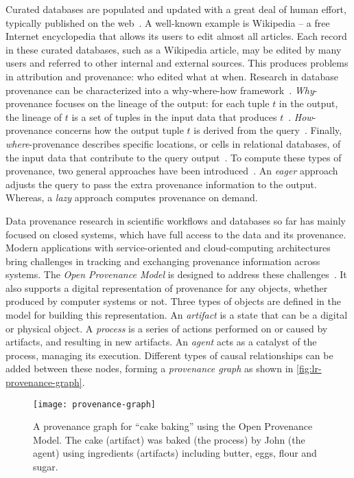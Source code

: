 Curated databases are populated and updated with a great deal of human effort, typically published on the web~\cite{Buneman2008}. A well-known example is Wikipedia -- a free Internet encyclopedia that allows its users to edit almost all articles. Each record in these curated databases, such as a Wikipedia article, may be edited by many users and referred to other internal and external sources. This produces problems in attribution and provenance: who edited what at when. Research in database provenance can be characterized into a why-where-how framework~\cite{Cheney2007}. \emph{Why}-provenance focuses on the lineage of the output: for each tuple $t$ in the output, the lineage of $t$ is a set of tuples in the input data that produces $t$~\cite{Cui2000}. \emph{How}-provenance concerns how the output tuple $t$ is derived from the query~\cite{Green2007}. Finally, \emph{where}-provenance describes specific locations, or cells in relational databases, of the input data that contribute to the query output~\cite{Buneman2001}. To compute these types of provenance, two general approaches have been introduced~\cite{Buneman2008}. An \emph{eager} approach adjusts the query to pass the extra provenance information to the output. Whereas, a \emph{lazy} approach computes provenance on demand.

Data provenance research in scientific workflows and databases so far has mainly focused on closed systems, which have full access to the data and its provenance. Modern applications with service-oriented and cloud-computing architectures bring challenges in tracking and exchanging provenance information across systems. The \emph{Open Provenance Model} is designed to address these challenges~\cite{Moreau2011}. It also supports a digital representation of provenance for any objects, whether produced by computer systems or not. Three types of objects are defined in the model for building this representation. An \emph{artifact} is a state that can be a digital or physical object. A \emph{process} is a series of actions performed on or caused by artifacts, and resulting in new artifacts. An \emph{agent} acts as a catalyst of the process, managing its execution. Different types of causal relationships can be added between these nodes, forming a \emph{provenance graph} as shown in \autoref{fig:lr-provenance-graph}.

\begin{figure}[!htb]
	\centering	
	\texttt{[image: provenance-graph]}
	\caption[An example of provenance graph]{A provenance graph for ``cake baking'' using the Open Provenance Model. The cake (artifact) was baked (the process) by John (the agent) using ingredients (artifacts) including butter, eggs, flour and sugar. }
	\label{fig:lr-provenance-graph}
\end{figure}

